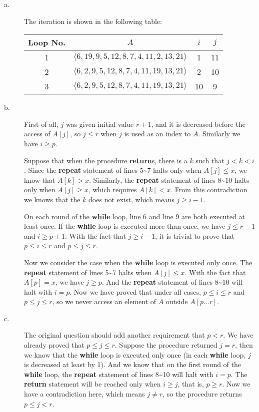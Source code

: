 \documentclass[a4paper,10pt]{article}
\begin{document}
\begin{description}
\item[a. \hspace{9pt}] The iteration is shown in the following table:

\begin{center}
\begin{tabular}{|c|c|c|c|}
\hline
Loop No. & $A$ & $i$ & $j$\\\hline
1 & $\langle 6, 19, 9, 5, 12, 8, 7, 4, 11, 2, 13, 21\rangle$ & 1 & 11\\\hline
2 & $\langle 6, 2, 9, 5, 12, 8, 7, 4, 11, 19, 13, 21\rangle$ & 2 & 10\\\hline
3 & $\langle 6, 2, 9, 5, 12, 8, 7, 4, 11, 19, 13, 21\rangle$ & 10 & 9\\\hline
\end{tabular}
\end{center}

\item[b. \hspace{9pt}] First of all, $j$ was given initial value $r + 1$, and it is decreased before
the access of $A[j]$, so $j\leq r$ when $j$ is used as an index to $A$.
Similarly we have $i \geq p$.

Suppose that when the procedure \textbf{return}s, there is a $k$ such that $j < k < i$.
Since the \textbf{repeat} statement of lines 5\textasciitilde  7 halts only when $A[j] \leq x$, 
we know that $A[k] > x$. Similarly, the \textbf{repeat} statement of lines 8\textasciitilde 10
halts only when $A[j] \geq x$, which requires $A[k] < x$. From this contradiction we knows
that the $k$ does not exist, which means $j \geq i - 1$.

On each round of the \textbf{while} loop, line 6 and line 9 are both executed at least once.
If the \textbf{while} loop is executed more than once, we have $j \leq r - 1$ and
$i \geq p + 1$. With the fact that $j \geq i -1$, it is trivial to prove that 
$p \leq i \leq r$ and $p \leq j \leq r$.


Now we consider the case when the \textbf{while} loop is executed only once. The
\textbf{repeat} statement of lines 5\textasciitilde 7 halts when $A[j] \leq x$. With the fact that $A[p] = x$,
we have $j \geq p$. And the \textbf{repeat} statement of lines 8\textasciitilde 10 will halt with $i = p$.
Now we have proved that under all cases, $p \leq i \leq r$ and $p \leq j \leq r$, 
so we never access an element of $A$ outside $A[p\ldots r]$.


\item[c. \hspace{9pt}] The original question should add another requirement that $p < r$. We have
already proved that $p \leq j \leq r$. Suppose the procedure returned $j = r$, then
we know that the \textbf{while} loop is executed only once (in each \textbf{while} loop, $j$ is
decreased at least by 1). And we know that on the first round of the \textbf{while}
loop, the \textbf{repeat} statement of lines 8\textasciitilde 10 will halt with $i = p$. The \textbf{return}
statement will be reached only when $i \geq j$, that is, $p \geq r $. Now we have
a contradiction here, which means $j \neq r$, so the procedure returns $p \leq j < r$.


\end{description}
\end{document}
